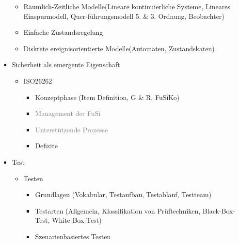 \begin{itemize}
\begin{itemize}
              \item R\"aumlich-Zeitliche Modelle(Lineare kontinuierliche Systeme, Lineares Einspurmodell, Quer-\linebreak f\"uhrungsmodell 5. \& 3. Ordnung, Beobachter)
              \item Einfache Zustandsregelung
              \item Diskrete ereignisorientierte Modelle(Automaten, Zustandskaten)
          \end{itemize}
    \item Sicherheit als emergente Eigenschaft\begin{itemize}
        \item ISO26262\begin{itemize}
            \item Konzeptphase (Item Definition, G \& R, FuSiKo)
            \item \textcolor{gray}{Management der FuSi}
            \item \textcolor{gray}{Unterstützende Prozesse}
            \item Defizite
        \end{itemize}
    \end{itemize}
    \item Test\begin{itemize}
        \item Testen\begin{itemize}
            \item Grundlagen (Vokabular, Testaufbau, Testablauf, Testteam)
            \item Testarten (Allgemein, Klassifikation von Prüftechniken, Black-Box-Test, White-Box-Test)
            \item Szenarienbasiertes Testen
        \end{itemize}
    \end{itemize}
\end{itemize}

